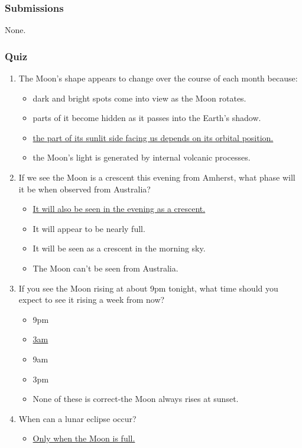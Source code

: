\documentclass[12pt]{article}
\begin{document}
\subsubsection{Submissions}
None.

\subsubsection{Quiz}
\begin{enumerate}
\item
The Moon's shape appears to change over the course of each month because:
\begin{itemize}
    \item dark and bright spots come into view as the Moon rotates.
    \item parts of it become hidden as it passes into the Earth's shadow.
    \item \underline{the part of its sunlit side facing us depends on its orbital position.}
    \item the Moon's light is generated by internal volcanic processes.
\end{itemize}
\item
If we see the Moon is a crescent this evening from Amherst, what phase will it be when observed from Australia?
\begin{itemize}
    \item \underline{It will also be seen in the evening as a crescent.}
    \item It will appear to be nearly full.
    \item It will be seen as a crescent in the morning sky.
    \item The Moon can't be seen from Australia.
\end{itemize}
\item
If you see the Moon rising at about 9pm tonight, what time should you expect to see it rising a week from now?
\begin{itemize}
    \item 9pm
    \item \underline{3am}
    \item 9am
    \item 3pm
    \item None of these is correct-the Moon always rises at sunset.
\end{itemize}
\item
When can a lunar eclipse occur?
\begin{itemize}
    \item \underline{Only when the Moon is full.}

\end{itemize}
\end{enumerate}
\end{document}
